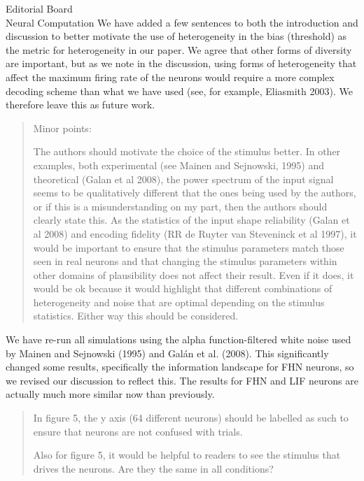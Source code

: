 \documentclass[]{letter}
\begin{document}
\begin{letter}{Editorial Board\\Neural Computation}
We have added a few sentences to both the introduction and discussion to better motivate the use of heterogeneity in the bias (threshold) as the metric for heterogeneity in our paper. We agree that other forms of diversity are important, but as we note in the discussion, using forms of heterogeneity that affect the maximum firing rate of the neurons would require a more complex decoding scheme than what we have used (see, for example, Eliasmith 2003). We therefore leave this as future work.


\begin{quotation}
\noindent Minor points:
\vspace{0.5em}

The authors should motivate the choice of the stimulus better.  In other examples, both experimental (see Mainen and Sejnowski, 1995) and theoretical (Galan et al 2008), the power spectrum of the input signal seems to be qualitatively different that the ones being used by the authors, or if this is a misunderstanding on my part, then the authors should clearly state this.   As the statistics of the input shape reliability (Galan et al 2008) and encoding fidelity (RR de Ruyter van Steveninck et al 1997), it would be important to ensure that the stimulus parameters match those seen in real neurons and that changing the stimulus parameters within other domains of plausibility does not affect their result.  Even if it does, it would be ok because it would highlight that different combinations of heterogeneity and noise that are optimal depending on the stimulus statistics.  Either way this should be considered.
\end{quotation}

We have re-run all simulations using the alpha function-filtered white noise used by Mainen and Sejnowski (1995) and Gal\'an et al. (2008). This significantly changed some results, specifically the information landscape for FHN neurons, so we revised our discussion to reflect this. The results for FHN and LIF neurons are actually much more similar now than previously.

\begin{quotation}
In figure 5, the y axis (64 different neurons) should be labelled as such to ensure that neurons are not confused with trials.

Also for figure 5, it would be helpful to readers to see the stimulus that drives the neurons.  Are they the same in all conditions?
\end{quotation}


\end{letter}
\end{document}
